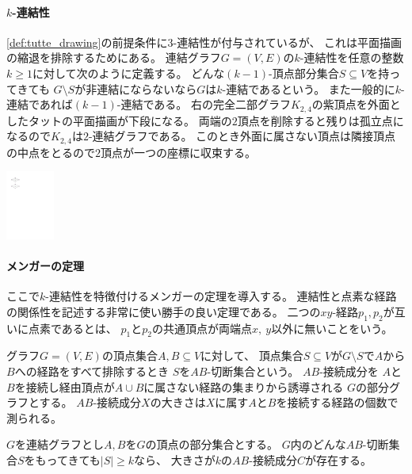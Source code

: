 \begin{paracol}{2}

\paragraph{$k$-連結性}
\cref{def:tutte_drawing}の前提条件に$3$-連結性が付与されているが、
これは平面描画の縮退を排除するためにある。
連結グラフ$G=(V, E)$の$k$-連結性を任意の整数$k\geq 1$に対して次のように定義する。
どんな$(k-1)$-頂点部分集合$S \subseteq V$を持ってきても
$G \setminus S$が非連結にならないなら$G$は$k$-連結であるという。
また一般的に$k$-連結であれば$(k-1)$-連結である。
右の完全二部グラフ$K_{2,4}$の紫頂点を外面としたタットの平面描画が下段になる。
両端の$2$頂点を削除すると残りは孤立点になるので$K_{2,4}$は$2$-連結グラフである。
このとき外面に属さない頂点は隣接頂点の中点をとるので$2$頂点が一つの座標に収束する。

\switchcolumn
\vspace{1.5\intextsep}
\centering
\includegraphics[width=0.12\textwidth]{figures/tutte_degeneracy.pdf}
\end{paracol}


\paragraph{メンガーの定理}
ここで$k$-連結性を特徴付けるメンガーの定理を導入する。
連結性と点素な経路の関係性を記述する非常に使い勝手の良い定理である。
二つの$xy$-経路$p_1, p_2$が互いに点素であるとは、
$p_1$と$p_2$の共通頂点が両端点$x,~y$以外に無いことをいう。

グラフ$G=(V, E)$の頂点集合$A, B \subseteq V$に対して、
頂点集合$S\subseteq V$が$G \setminus S$で$A$から$B$への経路をすべて排除するとき
$S$を$AB$-切断集合という。
$AB$-接続成分を
$A$と$B$を接続し経由頂点が$A \cup B$に属さない経路の集まりから誘導される
$G$の部分グラフとする。
$AB$-接続成分$X$の大きさは$X$に属す$A$と$B$を接続する経路の個数で測られる。

\begin{theorem}[メンガーの定理]
\label{thm:menger}
$G$を連結グラフとし$A, B$を$G$の頂点の部分集合とする。
$G$内のどんな$AB$-切断集合$S$をもってきても$|S| \geq k$なら、
大きさが$k$の$AB$-接続成分$C$が存在する。
\end{theorem}

